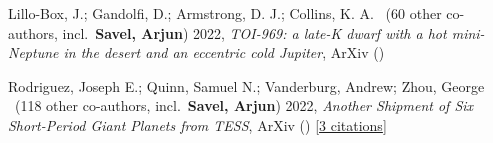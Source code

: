 \item[{\color{numcolor}\scriptsize2}] Lillo-Box, J.; Gandolfi, D.; Armstrong, D. J.; Collins, K. A. \etal \ ({60} other co-authors, incl.\ \textbf{Savel, Arjun}) 2022, \emph{TOI-969: a late-K dwarf with a hot mini-Neptune in the desert and an eccentric cold Jupiter}, ArXiv ()

\item[{\color{numcolor}\scriptsize1}] Rodriguez, Joseph E.; Quinn, Samuel N.; Vanderburg, Andrew; Zhou, George \etal \ ({118} other co-authors, incl.\ \textbf{Savel, Arjun}) 2022, \emph{Another Shipment of Six Short-Period Giant Planets from TESS}, ArXiv () [\href{https://ui.adsabs.harvard.edu/abs/2022arXiv220505709R}{3 citations}]